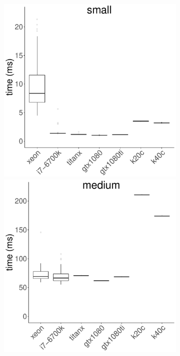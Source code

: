 \documentclass[../document.tex]{subfiles}
\begin{document}
\begin{figure}
\begin{subfigure}{0.9\textwidth}
		\includegraphics[width=\plotwidth]{figures/time-results/generate_kmeans_no_knl_small_boxplot-1}
		\includegraphics[width=\plotwidth]{figures/time-results/generate_kmeans_no_knl_medium_boxplot-1}

\end{subfigure}
\end{figure}
\end{document}
